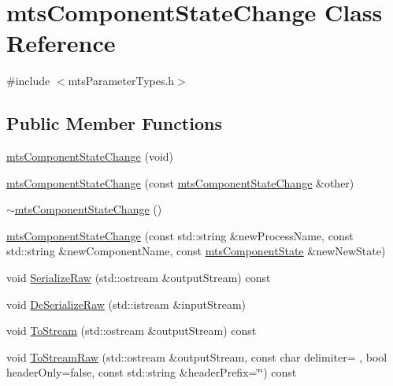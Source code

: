 \hypertarget{classmts_component_state_change}{}\section{mts\+Component\+State\+Change Class Reference}
\label{classmts_component_state_change}


{\ttfamily \#include $<$mts\+Parameter\+Types.\+h$>$}

\subsection*{Public Member Functions}
\begin{DoxyCompactItemize}
\item 
\hyperlink{classmts_component_state_change_a5dc37ee3dc8836e824627f7229bdd236}{mts\+Component\+State\+Change} (void)
\item 
\hyperlink{classmts_component_state_change_a43aa2c2066a952bebe4eb093cf1d240f}{mts\+Component\+State\+Change} (const \hyperlink{classmts_component_state_change}{mts\+Component\+State\+Change} \&other)
\item 
\hyperlink{classmts_component_state_change_aaf67fd9dbb449fd51f1ec649479c088d}{$\sim$mts\+Component\+State\+Change} ()
\item 
\hyperlink{classmts_component_state_change_a343ac8a91e4299e056350735d5a6c140}{mts\+Component\+State\+Change} (const std\+::string \&new\+Process\+Name, const std\+::string \&new\+Component\+Name, const \hyperlink{classmts_component_state}{mts\+Component\+State} \&new\+New\+State)
\item 
void \hyperlink{classmts_component_state_change_a0b088d4104fa400c5e2a1025de2e2b2c}{Serialize\+Raw} (std\+::ostream \&output\+Stream) const 
\item 
void \hyperlink{classmts_component_state_change_a3afde6ad034e79da64dcf29742f074ef}{De\+Serialize\+Raw} (std\+::istream \&input\+Stream)
\item 
void \hyperlink{classmts_component_state_change_af6b19ba3c31199051c46eb1f18fb29e8}{To\+Stream} (std\+::ostream \&output\+Stream) const 
\item 
void \hyperlink{classmts_component_state_change_ae64dad5e63a8b2e9013ff0fc086712d5}{To\+Stream\+Raw} (std\+::ostream \&output\+Stream, const char delimiter= \textquotesingle{} \textquotesingle{}, bool header\+Only=false, const std\+::string \&header\+Prefix=\char`\"{}\char`\"{}) const 
\item 

\end{DoxyCompactItemize}
